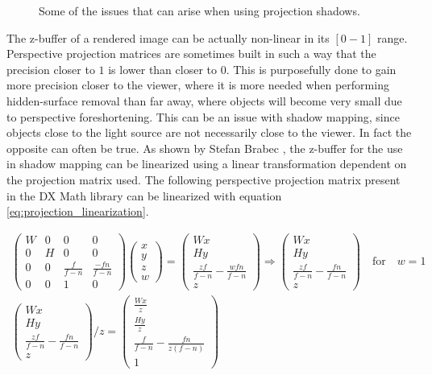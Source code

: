 \begin{figure}[h]
    \caption{Some of the issues that can arise when using projection shadows.}
    \label{fig:shadow_mapping_issues}
\end{figure}

The z-buffer of a rendered image can be actually non-linear in its \([0-1]\) range. Perspective projection matrices are sometimes built in such a way that the precision closer to \(1\) is lower than closer to \(0\). This is purposefully done to gain more precision closer to the viewer, where it is more needed when performing hidden-surface removal than far away, where objects will become very small due to perspective foreshortening. This can be an issue with shadow mapping, since objects close to the light source are not necessarily close to the viewer. In fact the opposite can often be true. As shown by Stefan Brabec \cite{bib:article:brabec_linear_depth}, the z-buffer for the use in shadow mapping can be linearized using a linear transformation dependent on the projection matrix used. The following perspective projection matrix present in the DX Math library can be linearized with equation \ref{eq:projection_linearization}.

\begin{gather}
	\label{eq:projection_perspective}
	\begin{pmatrix}
		W & 0 & 0 & 0\\
		0 & H & 0 & 0\\
		0 & 0 & \frac{f}{f-n} & \frac{-fn}{f-n}\\
		0 & 0 & 1 & 0
	\end{pmatrix}
    \begin{pmatrix}
		x\\
		y\\
		z\\
		w
	\end{pmatrix} =
    \begin{pmatrix}
		Wx\\
		Hy\\
		\frac{zf}{f-n} - \frac{wfn}{f-n}\\
		z
	\end{pmatrix} \Rightarrow 
    \begin{pmatrix}
		Wx\\
		Hy\\
		\frac{zf}{f-n} - \frac{fn}{f-n}\\
		z
	\end{pmatrix}
    \quad \text{for} \quad w = 1\\[10pt]
    \begin{pmatrix}
		Wx\\
		Hy\\
		\frac{zf}{f-n} - \frac{fn}{f-n}\\
		z
	\end{pmatrix} / z =
    \begin{pmatrix}
		\frac{Wx}{z}\\
		\frac{Hy}{z}\\
		\frac{f}{f-n} - \frac{fn}{z(f-n)}\\
		1
	\end{pmatrix}
\end{gather}


